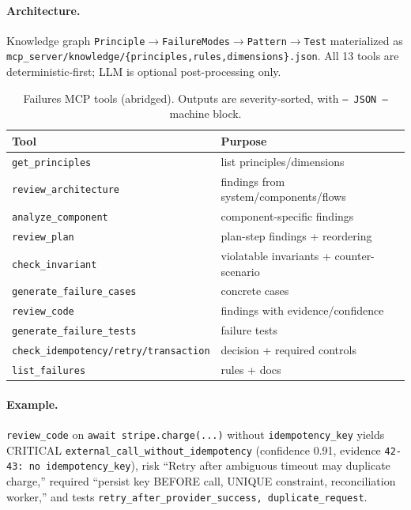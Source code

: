 \documentclass[conference]{IEEEtran}
\begin{document}
\paragraph{Architecture.} Knowledge graph \texttt{Principle$\rightarrow$FailureModes$\rightarrow$Pattern$\rightarrow$Test} materialized as \texttt{mcp\_server/knowledge/\{principles,rules,dimensions\}.json}. All 13 tools are deterministic-first; LLM is optional post-processing only.

\begin{table}[h]\centering\small
\begin{tabular}{ll}
\toprule Tool & Purpose \\
\midrule
\texttt{get\_principles} & list principles/dimensions \\
\texttt{review\_architecture} & findings from system/components/flows \\
\texttt{analyze\_component} & component-specific findings \\
\texttt{review\_plan} & plan-step findings + reordering \\
\texttt{check\_invariant} & violatable invariants + counter-scenario \\
\texttt{generate\_failure\_cases} & concrete cases \\
\texttt{review\_code} & findings with evidence/confidence \\
\texttt{generate\_failure\_tests} & failure tests \\
\texttt{check\_idempotency/retry/transaction} & decision + required controls \\
\texttt{list\_failures} & rules + docs \\
\bottomrule
\end{tabular}
\caption{Failures MCP tools (abridged). Outputs are severity-sorted, with \texttt{--- JSON ---} machine block.}
\end{table}

\paragraph{Example.} \texttt{review\_code} on \texttt{await stripe.charge(...)} without \texttt{idempotency\_key} yields CRITICAL \texttt{external\_call\_without\_idempotency} (confidence 0.91, evidence \texttt{42-43: no idempotency\_key}), risk ``Retry after ambiguous timeout may duplicate charge,'' required ``persist key BEFORE call, UNIQUE constraint, reconciliation worker,'' and tests \texttt{retry\_after\_provider\_success, duplicate\_request}.
\end{document}
